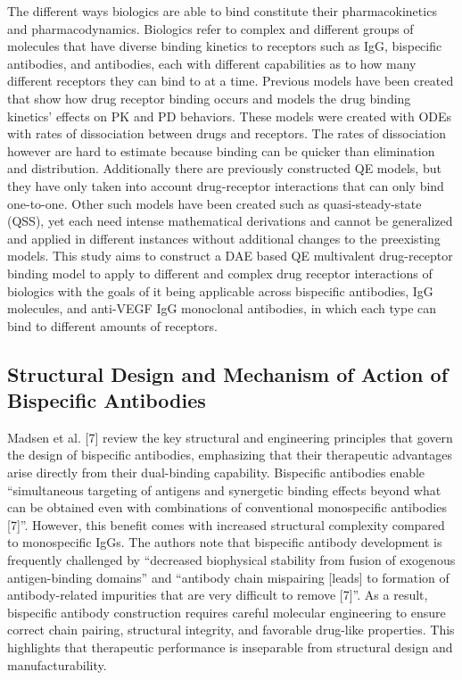 \documentclass[11pt]{article}
\begin{document}
The different ways biologics are able to bind constitute their pharmacokinetics  and pharmacodynamics. Biologics refer to complex and different groups of molecules that have diverse binding kinetics to receptors such as IgG, bispecific antibodies, and antibodies, each with different capabilities as to how many different receptors they can bind to at a time. Previous models have been created that show how drug receptor binding occurs and models the drug binding kinetics’ effects on PK and PD behaviors. These models were created with ODEs with rates of dissociation between drugs and receptors. The rates of dissociation however are hard to estimate because binding can be quicker than elimination and distribution. Additionally there are previously constructed QE  models, but they have only taken into account drug-receptor interactions that can only bind one-to-one. Other such models have been created such as quasi-steady-state (QSS), yet each need intense mathematical derivations and cannot be generalized and applied in different instances without additional changes to the preexisting models. This study aims to construct a DAE based QE multivalent drug-receptor binding model to apply to different and complex drug receptor interactions of biologics with the goals of it being applicable across bispecific antibodies, IgG molecules, and anti-VEGF IgG monoclonal antibodies, in which each type can bind to different amounts of receptors.
\par\medskip

\subsection{Structural Design and Mechanism of Action of Bispecific Antibodies}

Madsen et al. [7] review the key structural and engineering principles that govern the design of bispecific antibodies, emphasizing that their therapeutic advantages arise directly from their dual-binding capability. Bispecific antibodies enable “simultaneous targeting of antigens and synergetic binding effects beyond what can be obtained even with combinations of conventional monospecific antibodies [7]”. However, this benefit comes with increased structural complexity compared to monospecific IgGs. The authors note that bispecific antibody development is frequently challenged by “decreased biophysical stability from fusion of exogenous antigen-binding domains” and “antibody chain mispairing [leads] to formation of antibody-related impurities that are very difficult to remove [7]”. As a result, bispecific antibody construction requires careful molecular engineering to ensure correct chain pairing, structural integrity, and favorable drug-like properties. This highlights that therapeutic performance is inseparable from structural design and manufacturability.
\par\medskip
\end{document}
